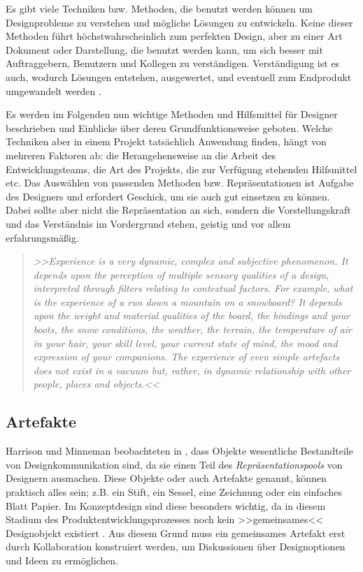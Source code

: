 \medskip Es gibt viele Techniken bzw. Methoden, die benutzt werden können um Designprobleme zu verstehen und mögliche Lösungen zu entwickeln. Keine dieser Methoden führt höchstwahrscheinlich zum perfekten Design, aber zu einer Art Dokument oder Darstellung, die benutzt werden kann, um sich besser mit Auftraggebern, Benutzern und Kollegen zu verständigen. Verständigung ist es auch, wodurch Lösungen entstehen, ausgewertet, und eventuell zum Endprodukt umgewandelt werden \citep{Benyon:2005}.

\medskip Es werden im Folgenden nun wichtige Methoden und Hilfsmittel für Designer beschrieben und Einblicke über deren Grundfunktionsweise geboten. Welche Techniken aber in einem Projekt tatsächlich Anwendung finden, hängt von mehreren Faktoren ab: die Herangehensweise an die Arbeit des Entwicklungsteams, die Art des Projekts, die zur Verfügung stehenden Hilfsmittel etc. Das Auswählen von passenden Methoden bzw. Repräsentationen ist Aufgabe des Designers und erfordert Geschick, um sie auch gut einsetzen zu können. Dabei sollte aber nicht die Repräsentation an sich, sondern die Vorstellungskraft und das Verständnis im Vordergrund stehen, geistig und vor allem erfahrungsmäßig. \citep{Sagmeister:2008} 

\begin{quote}
	\textsl{>>Experience is a very dynamic, complex and subjective phenomenon. It depends upon the perception of multiple sensory qualities of a design, interpreted through filters relating to contextual factors. For example, what is the experience of a run down a mountain on a snowboard? It depends upon the weight and material qualities of the board, the bindings and your boots, the snow conditions, the weather, the terrain, the temperature of air in your hair, your skill level, your current state of mind, the mood and expression of your companions. The experience of even simple artefacts does not exist in a vacuum but, rather, in dynamic relationship with other people, places and objects.<<}
\begin{flushright}\citep{Buxton:2007}\end{flushright}
\end{quote}
\clearpage

\subsection{Artefakte} 
Harrison und Minneman beobachteten in \citep{Harrison:1996}, dass Objekte wesentliche Bestandteile von Designkommunikation sind, da sie einen Teil des \emph{Repräsentationspools} von Designern ausmachen. Diese Objekte oder auch Artefakte genannt, können praktisch alles sein; z.B. ein Stift, ein Sessel, eine Zeichnung oder ein einfaches Blatt Papier. Im Konzeptdesign sind diese besonders wichtig, da in diesem Stadium des Produktentwicklungsprozesses noch kein >>gemeinsames<< Designobjekt existiert \citep{Tuikka:2001}. Aus diesem Grund muss ein gemeinsames Artefakt erst durch Kollaboration konstruiert werden, um Diskussionen über Designoptionen und Ideen zu ermöglichen. \citep{Larsson:2003}

